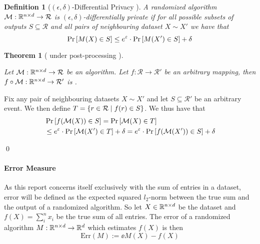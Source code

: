 \documentclass[a4paper,12pt]{article}
\renewenvironment{proof}{{\textit{Proof} \\}}{\qed}
\newtheorem{definition}{Definition}[section]
\newtheorem{theorem}{Theorem}
\begin{document}
\vspace*{0.3cm}
\begin{definition}[$(\epsilon, \delta)$-Differential Privacy \cite{dwork2016}]

A randomized algorithm $\mathcal{M}: \mathbb{R}^{n \times d} \rightarrow \mathcal{R}$ 
is $(\epsilon, \delta)$-differentially private if for all possible 
subsets of outputs $S \subseteq \mathcal{R}$ and all pairs of 
neighbouring dataset $X \sim X'$ we have that
\[ \Pr\left [M(X) \in S \right] \le e^{\varepsilon} \cdot \Pr\left [M(X') \in S \right] + \delta \]

\end{definition}

\begin{theorem}[ \edp under post-processing \cite{dpbasic}] %
\label{theo:PostProc}

Let $\mathcal{M}: \mathbb{R}^{n \times d} \rightarrow \mathcal{R}$ be an \edp 
algorithm. Let $f: \mathcal{R} \rightarrow \mathcal{R}'$ 
be an arbitrary mapping, then 
$f \circ \mathcal{M}: \mathbb{R}^{n \times d} \rightarrow \mathcal{R}'$ is \edp.

\end{theorem}

\begin{proof}

Fix any pair of neighbouring datasets $X \sim X'$ and 
let $S \subseteq \mathcal{R}'$ be an arbitrary event. We then define 
$T = \left \{ r \in \mathcal{R} \; \text{\textbar} \; f(r) \in S\right\}$.
We thus have that
\begin{align*}
    &\Pr\left [f(\mathcal{M}(X)) \in S \right] = \Pr\left [\mathcal{M}(X) \in T \right] \\
    &\le e^{\varepsilon} \cdot \Pr\left [\mathcal{M}(X') \in T \right] + \delta = 
    e^{\varepsilon} \cdot \Pr\left [f(\mathcal{M}(X')) \in S \right] + \delta
\end{align*}
    
\end{proof}


    

\paragraph{Error Measure}
As this report concerns itself exclusively with the sum of entries 
in a dataset, error will be defined as the expected
squared $l_2$-norm between the true sum and 
the output of a randomized algorithm.
So let $X \in \mathbb{R}^{n \times d}$ be the dataset and
$f(X) = \sum_i^n x_i$ be the true sum of all entries. The error of a
randomized algorithm $M : \mathbb{R}^{n \times d} \rightarrow \mathbb{R}^d$
which estimates $f(X)$ is then 
\[
    \text{Err}(M) := \ee{M(X) - f(X)}
\]
\end{document}
